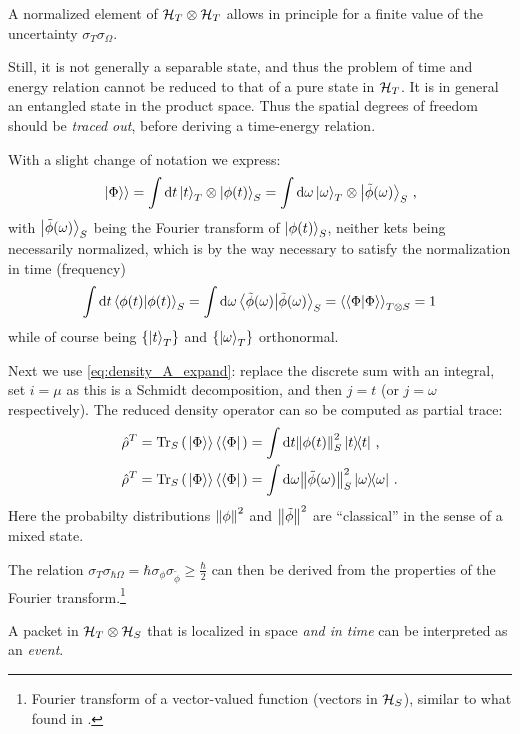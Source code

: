 A normalized element of $\mathcal{H}_T \otimes \mathcal{H}_T$ allows in principle for a finite value
of the uncertainty $\sigma_{T}\sigma_{\Omega}$.

Still, it is not generally
a separable state,
and thus
the problem of time and energy relation cannot be reduced to that of
a pure state in $\mathcal{H}_T$.
It is in general an entangled state in the product space.
Thus the spatial degrees of freedom should be \emph{traced out},
before deriving a time-energy relation.

With a slight change of notation we express:
\begin{equation}
  \left.\left| \Phi \right\rangle\right\rangle =
    \int \dd{t} \ket{t}_T \otimes \ket{\phi(t)}_S =
    \int \dd\omega \ket{\omega}_T \otimes \ket{\tilde{\phi}(\omega)}_S \, \text{,}
\end{equation}
with $\ket{\tilde{\phi}(\omega)}_S$ being the Fourier transform
of $\ket{\phi(t)}_S$,
neither kets being necessarily normalized, which is by the way necessary
to satisfy the normalization in time (frequency)
\[
  \int \dd{t} \braket{\phi(t)}_S =
    \int \dd{\omega} \braket{\tilde{\phi}(\omega)}_S =
    \left\langle\left\langle \Phi \middle| \Phi \right\rangle\right\rangle_{T \otimes S} = 
    1
\]
while of course being $\left\{\ket{t}_T\right\}$ and $\left\{\ket{\omega}_T\right\}$
orthonormal.

Next we use \eqref{eq:density_A_expand}: replace the discrete sum with an integral,
set $i = \mu$ as this is a Schmidt decomposition, and then $j = t$
(or $j = \omega$ respectively).
The reduced density operator can so be computed
as partial trace:
\begin{align}
  \label{eq:ptrace_density_matrix_t}
  \hat{\rho}^T = \Tr_S\qty(\left.\left| \Phi \right\rangle\right\rangle\left\langle\left\langle \Phi \right|\right.) &= \int \dd t \norm{\phi(t)}^2_S \ketbra{t}{t}
    \, \text{,}
  \\
  \label{eq:ptrace_density_matrix_omega}
  \hat{\rho}^T = \Tr_S\qty(\left.\left| \Phi \right\rangle\right\rangle\left\langle\left\langle \Phi \right|\right.) &= \int \dd \omega \norm{\tilde{\phi}(\omega)}^2_S \ketbra{\omega}{\omega}
    \,\text{.} 
\end{align}
Here the probabilty distributions $\norm{\phi}^2$ and $\norm{\tilde{\phi}}^2$
are ``classical'' in the sense of a mixed state.

The relation $\sigma_T\sigma_{\hbar\Omega} = \hbar \sigma_{\phi} \sigma_{\tilde{\phi}} \geq \frac{\hbar}{2}$
can then be derived from the properties of the Fourier transform.\footnote{
  Fourier transform of a
  vector-valued function
  (vectors in $\mathcal{H}_S$),
  similar to what found in \cite{Maccone:Pauli}.
}

A packet in $\mathcal{H}_T \otimes \mathcal{H}_S$ that is localized in space \emph{and in time} can be interpreted as an \emph{event}.

